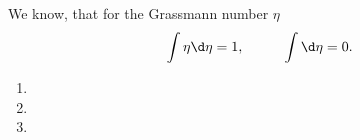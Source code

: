 

We know, that for the Grassmann number $\eta$
\begin{equation*}
	\int \eta \d \eta = 1,
	\hspace{10 mm} 
	\int \d \eta = 0.
\end{equation*}

\begin{enumerate}
	\item 
	\item 
	\item 
\end{enumerate}